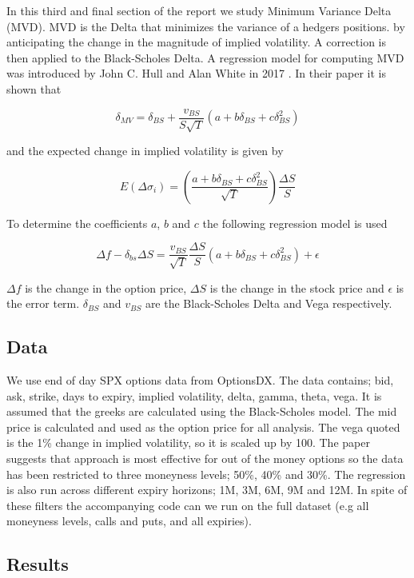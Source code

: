 \documentclass{article}
\begin{document}
In this third and final section of the report we study Minimum Variance Delta (MVD). MVD is the Delta that minimizes the variance of a hedgers positions.
by anticipating the change in the magnitude of implied volatility. A correction is then applied to the Black-Scholes Delta. 
A regression model for computing MVD was introduced by John C. Hull and Alan White in 2017 \cite{hull}. In their paper it is shown that 

\[
\delta_{MV} = \delta_{BS} + \frac{v_{BS}}{S \sqrt{T}} (a + b \delta_{BS} + c \delta_{BS}^2)
\]

and the expected change in implied volatility is given by

\[
E(\Delta \sigma_i) = \left ( \frac{a + b \delta_{BS} + c \delta_{BS}^2}{\sqrt{T}} \right ) \frac{\Delta S}{S}
\]

To determine the coefficients $a$, $b$ and $c$ the following regression model is used

\[
\Delta f - \delta_{bs} \Delta S = \frac{v_{BS}}{\sqrt{T}} \frac{\Delta S}{S} (a + b \delta_{BS} + c \delta_{BS}^2) + \epsilon
\]

$\Delta f$ is the change in the option price, $\Delta S$ is the change in the stock price and $\epsilon$ is the error term. $\delta_{BS}$ and $v_{BS}$ are the Black-Scholes 
Delta and Vega respectively.    

\subsection{Data}

We use end of day SPX options data from OptionsDX. The data contains; bid, ask, strike, days to expiry, implied volatility, delta, gamma, theta, vega. It is assumed
that the greeks are calculated using the Black-Scholes model. The mid price is calculated and used as the option price for all analysis. The vega quoted is the 1\% 
change in implied volatility, so it is scaled up by 100.  The paper suggests that approach is most effective for out of the money options so the data has been restricted to
three moneyness levels; 50\%, 40\% and 30\%. The regression is also run across different expiry horizons; 1M, 3M, 6M, 9M and 12M.  In spite of these filters the accompanying
code can we run on the full dataset (e.g all moneyness levels, calls and puts, and all expiries).

\subsection{Results}
\end{document}
